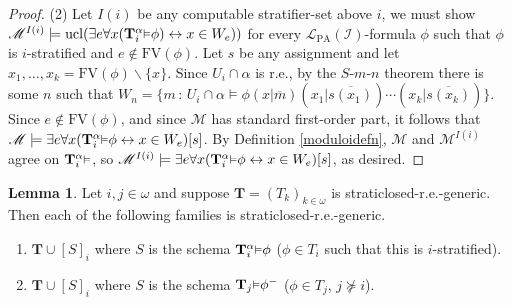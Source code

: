 \documentclass[reqno]{article}
\theoremstyle{definition}
\newtheorem{lemma}[theorem]{Lemma}
\def\L{\mathscr{L}}
\def\M{\mathscr{M}}
\def\T{\mathbf{T}}
\def\FV{\mathrm{FV}}
\def\LPA{\L_{\mathrm{PA}}}
\def\indset{\mathcal I}
\renewcommand{\Pr}[1]{\T_{#1}\mbox{\small${\vDash}$}}
\newcommand{\Prr}[2]{\T^{#1}_{#2}\mbox{\small${\vDash}$}}
\newcommand{\ucl}[1]{\mathrm{ucl}(#1)}
\begin{document}
\begin{proof}
\item
(2)
Let $I(i)$ be any computable stratifier-set above $i$,
we must show $\M^{I(i)}\models\ucl{\exists e\forall x(\Prr\alpha i \phi)\leftrightarrow
x\in W_e)}$ for every $\LPA(\indset)$-formula $\phi$ such that
$\phi$ is $i$-stratified and $e\not\in\FV(\phi)$.
Let $s$ be any assignment
and let $x_1,\ldots,x_k=\FV(\phi)\backslash \{x\}$.
Since $U_i\cap\alpha$ is r.e., by the $S$-$m$-$n$ theorem there is some $n$
such that
$W_n=\{m\,:\,U_i\cap\alpha\models \phi(x|\overline m)(x_1|\overline{s(x_1)})\cdots
(x_k|\overline{s(x_k)})\}$.
Since $e\not\in\FV(\phi)$, and since $\M$ has standard first-order part,
it follows that
$\M\models \exists e\forall x(\Prr\alpha i\phi \leftrightarrow x\in W_e)[s]$.
By Definition \ref{moduloidefn}, $\M$ and $\M^{I(i)}$ agree on $\Prr\alpha i$,
so $\M^{I(i)}\models \exists e\forall x(\Prr\alpha i\phi \leftrightarrow x\in W_e)[s]$,
as desired.
\end{proof}

\begin{lemma}
\label{secondutilbagclosure}
Let $i,j\in\omega$ and suppose $\T=(T_k)_{k\in\omega}$ is straticlosed-r.e.-generic.
Then each of the following families is straticlosed-r.e.-generic.
\begin{enumerate}
\item $\T\cup [S]_i$ where
$S$ is the schema $\Prr\alpha i\phi$ ($\phi\in T_i$ such that this is $i$-stratified).
\item $\T\cup [S]_i$ where
$S$ is the schema $\Pr j\phi^-$ ($\phi\in T_j$, $j\not \succeq i$).
\end{enumerate}
\end{lemma}
\end{document}
